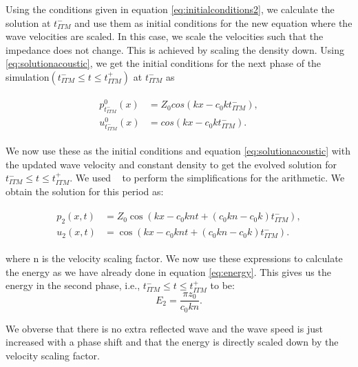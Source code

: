 Using the conditions given in equation \ref{eq:initialconditions2}, we calculate the solution at $t_{ITM}^-$ and use them as initial conditions for the new equation where the wave velocities are scaled.
In this case, we scale the velocities such that the impedance does not change. This is achieved by scaling the density down. Using \ref{eq:solutionacoustic}, we get the initial conditions for the next phase of the simulation$\left(t_{ITM}^- \leq t \leq t_{ITM}^+ \right)$ at $t_{ITM}^-$ as

\begin{align}
    \begin{split}
        p^0_{t_{ITM}^-}\left(x\right) &= Z_0 cos\left(kx - c_0kt_{ITM}^-\right), \\
        u^0_{t_{ITM}^-}\left(x\right) &= cos\left(kx - c_0kt_{ITM}^-\right) .
    \end{split}
\end{align}

We now use these as the initial conditions and equation \ref{eq:solutionacoustic} with the updated wave velocity and constant density to get the evolved solution for $t_{ITM}^- \leq t \leq t_{ITM}^+ $. 
We used ~\parencite{sagemath} to perform the simplifications for the arithmetic. We obtain the solution for this period as:

\begin{align}
    \begin{split}
        p_{2}\left(x, t\right) &= Z_{0} \cos\left(kx -c_{0} k n t + {\left(c_{0} k n - c_{0} k\right)} \mathit{t_{ITM}^-}\right), \\
        u_{2}\left(x, t\right) &= \cos\left(kx -c_{0} k n t + {\left(c_{0} k n - c_{0} k\right)} \mathit{t_{ITM}^-} \right) .
    \end{split}
\end{align}

where n is the velocity scaling factor. We now use these expressions to calculate the energy as we have already done in equation \ref{eq:energy}. This gives us the energy in the second phase, i.e., $t_{ITM}^- \leq t \leq t_{ITM}^+ $ to be:
\begin{equation}
    E_2 = \frac{\pi z_{0}}{c_{0} k n} .
\end{equation}

We obverse that there is no extra reflected wave and the wave speed is just increased with a phase shift and that the energy is directly scaled down by the velocity scaling factor. \\

